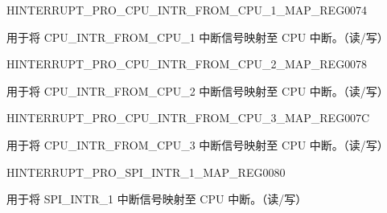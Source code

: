 \begin{register}{H}{INTERRUPT\_PRO\_CPU\_INTR\_FROM\_CPU\_1\_MAP\_REG}{\hexprefix{}0074}\label{regdesc:INTERRUPTPROCPUINTRFROMCPU1MAPREG}
%
%
\regnewline%
\begin{regdesc}\begin{reglist}
\label{fielddesc:INTERRUPTPROCPUINTRFROMCPU1MAP}\item [INTERRUPT\_PRO\_CPU\_INTR\_FROM\_CPU\_1\_MAP] 用于将 CPU\_INTR\_FROM\_CPU\_1 中断信号映射至 CPU 中断。（读/写）
\end{reglist}\end{regdesc}
\end{register}


\begin{register}{H}{INTERRUPT\_PRO\_CPU\_INTR\_FROM\_CPU\_2\_MAP\_REG}{\hexprefix{}0078}\label{regdesc:INTERRUPTPROCPUINTRFROMCPU2MAPREG}
%
%
\regnewline%
\begin{regdesc}\begin{reglist}
\label{fielddesc:INTERRUPTPROCPUINTRFROMCPU2MAP}\item [INTERRUPT\_PRO\_CPU\_INTR\_FROM\_CPU\_2\_MAP] 用于将 CPU\_INTR\_FROM\_CPU\_2 中断信号映射至 CPU 中断。（读/写）
\end{reglist}\end{regdesc}
\end{register}


\begin{register}{H}{INTERRUPT\_PRO\_CPU\_INTR\_FROM\_CPU\_3\_MAP\_REG}{\hexprefix{}007C}\label{regdesc:INTERRUPTPROCPUINTRFROMCPU3MAPREG}
%
%
\regnewline%
\begin{regdesc}\begin{reglist}
\label{fielddesc:INTERRUPTPROCPUINTRFROMCPU3MAP}\item [INTERRUPT\_PRO\_CPU\_INTR\_FROM\_CPU\_3\_MAP] 用于将 CPU\_INTR\_FROM\_CPU\_3 中断信号映射至 CPU 中断。（读/写）
\end{reglist}\end{regdesc}
\end{register}


\begin{register}{H}{INTERRUPT\_PRO\_SPI\_INTR\_1\_MAP\_REG}{\hexprefix{}0080}\label{regdesc:INTERRUPTPROSPIINTR1MAPREG}
%
%
\regnewline%
\begin{regdesc}\begin{reglist}
\label{fielddesc:INTERRUPTPROSPIINTR1MAP}\item [INTERRUPT\_PRO\_SPI\_INTR\_1\_MAP] 用于将 SPI\_INTR\_1 中断信号映射至 CPU 中断。（读/写）
\end{reglist}\end{regdesc}
\end{register}


